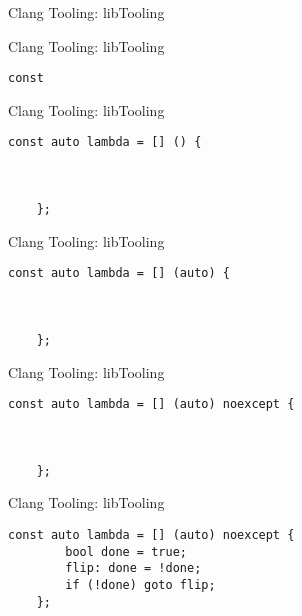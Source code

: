 \begin{frame}[fragile]{Clang Tooling: libTooling}
\end{frame}

\begin{frame}[fragile]{Clang Tooling: libTooling}
  \begin{lstlisting}[basicstyle=\large\ttfamily]
    const
  \end{lstlisting}
  \vspace{2cm}
\end{frame}

\begin{frame}[fragile]{Clang Tooling: libTooling}
  \begin{lstlisting}[basicstyle=\large\ttfamily]
    const auto lambda = [] () {



    };
  \end{lstlisting}
\end{frame}

\begin{frame}[fragile]{Clang Tooling: libTooling}
  \begin{lstlisting}[basicstyle=\large\ttfamily]
    const auto lambda = [] (auto) {



    };
  \end{lstlisting}
\end{frame}

\begin{frame}[fragile]{Clang Tooling: libTooling}
  \begin{lstlisting}[basicstyle=\large\ttfamily]
    const auto lambda = [] (auto) noexcept {



    };
  \end{lstlisting}
\end{frame}

\begin{frame}[fragile]{Clang Tooling: libTooling}
  \begin{lstlisting}[basicstyle=\large\ttfamily]
    const auto lambda = [] (auto) noexcept {
        bool done = true;
        flip: done = !done;
        if (!done) goto flip;
    };
  \end{lstlisting}
\end{frame}

